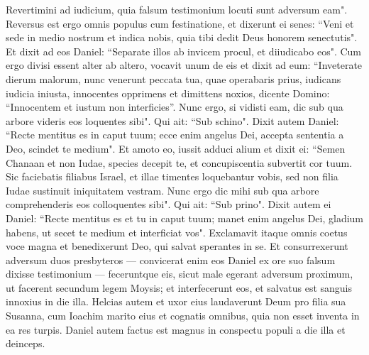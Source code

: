 \begin{biblechapter}
\verse Revertimini ad iudicium, quia falsum testimonium locuti sunt adversum eam".  
\verse Reversus est ergo omnis populus cum festinatione, et dixerunt ei senes: “Veni et sede in medio nostrum et indica nobis, quia tibi dedit Deus honorem senectutis". 
\verse Et dixit ad eos Daniel: “Separate illos ab invicem procul, et diiudicabo eos". 
\verse Cum ergo divisi essent alter ab altero, vocavit unum de eis et dixit ad eum: “Inveterate dierum malorum, nunc venerunt peccata tua, quae operabaris prius, 
\verse iudicans iudicia iniusta, innocentes opprimens et dimittens noxios, dicente Domino: “Innocentem et iustum non interficies”. 
\verse Nunc ergo, si vidisti eam, dic sub qua arbore videris eos loquentes sibi". Qui ait: “Sub schino". 
\verse Dixit autem Daniel: “Recte mentitus es in caput tuum; ecce enim angelus Dei, accepta sententia a Deo, scindet te medium".  
\verse Et amoto eo, iussit adduci alium et dixit ei: “Semen Chanaan et non Iudae, species decepit te, et concupiscentia subvertit cor tuum. 
\verse Sic faciebatis filiabus Israel, et illae timentes loquebantur vobis, sed non filia Iudae sustinuit iniquitatem vestram. 
\verse Nunc ergo dic mihi sub qua arbore comprehenderis eos colloquentes sibi". Qui ait: “Sub prino". 
\verse Dixit autem ei Daniel: “Recte mentitus es et tu in caput tuum; manet enim angelus Dei, gladium habens, ut secet te medium et interficiat vos". 
\verse Exclamavit itaque omnis coetus voce magna et benedixerunt Deo, qui salvat sperantes in se. 
\verse Et consurrexerunt adversum duos presbyteros — convicerat enim eos Daniel ex ore suo falsum dixisse testimonium — feceruntque eis, sicut male egerant adversum proximum, 
\verse ut facerent secundum legem Moysis; et interfecerunt eos, et salvatus est sanguis innoxius in die illa. 
\verse Helcias autem et uxor eius laudaverunt Deum pro filia sua Susanna, cum Ioachim marito eius et cognatis omnibus, quia non esset inventa in ea res turpis. 
\verse Daniel autem factus est magnus in conspectu populi a die illa et deinceps. 
\end{biblechapter}

